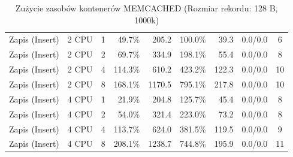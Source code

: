\begin{table}[ht]
{\begin{tabular}{llcrrrrcc}
Zapis (Insert) & 2 CPU & 1 & 49.7\% & 205.2 & 100.0\% & 39.3 & 0.0/0.0 & 6 \\
Zapis (Insert) & 2 CPU & 2 & 69.7\% & 334.9 & 198.1\% & 55.4 & 0.0/0.0 & 8 \\
Zapis (Insert) & 2 CPU & 4 & 114.3\% & 610.2 & 423.2\% & 122.3 & 0.0/0.0 & 10 \\
Zapis (Insert) & 2 CPU & 8 & 168.1\% & 1170.5 & 795.1\% & 217.8 & 0.0/0.0 & 10 \\
Zapis (Insert) & 4 CPU & 1 & 21.9\% & 204.8 & 125.7\% & 45.4 & 0.0/0.0 & 8 \\
Zapis (Insert) & 4 CPU & 2 & 54.0\% & 321.4 & 223.0\% & 73.2 & 0.0/0.0 & 8 \\
Zapis (Insert) & 4 CPU & 4 & 113.7\% & 624.0 & 381.5\% & 119.5 & 0.0/0.0 & 9 \\
Zapis (Insert) & 4 CPU & 8 & 208.1\% & 1238.7 & 744.8\% & 195.9 & 0.0/0.0 & 11 \\
\bottomrule
\end{tabular}%
}
\caption{Zużycie zasobów kontenerów MEMCACHED (Rozmiar rekordu: 128 B, 1000k)}
\label{tab:resources_memcached_small_1000000}
\end{table}
